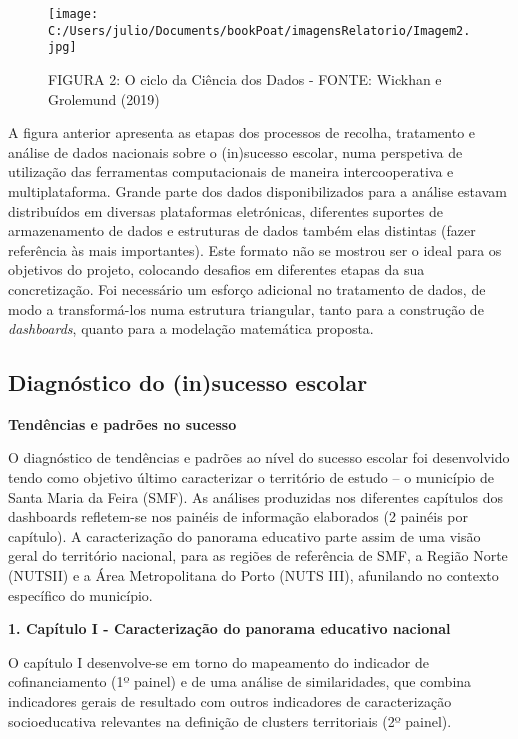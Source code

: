 \documentclass[
]{book}
\begin{document}
\begin{figure}
\centering
\texttt{[image: C:/Users/julio/Documents/bookPoat/imagensRelatorio/Imagem2.jpg]}
\caption{FIGURA 2: O ciclo da Ciência dos Dados - FONTE: Wickhan e Grolemund (2019)}
\end{figure}

A figura anterior apresenta as etapas dos processos de recolha, tratamento e análise de dados nacionais sobre o (in)sucesso escolar, numa perspetiva de utilização das ferramentas computacionais de maneira intercooperativa e multiplataforma. Grande parte dos dados disponibilizados para a análise estavam distribuídos em diversas plataformas eletrónicas, diferentes suportes de armazenamento de dados e estruturas de dados também elas distintas (fazer referência às mais importantes). Este formato não se mostrou ser o ideal para os objetivos do projeto, colocando desafios em diferentes etapas da sua concretização. Foi necessário um esforço adicional no tratamento de dados, de modo a transformá-los numa estrutura triangular, tanto para a construção de \emph{dashboards}, quanto para a modelação matemática proposta.

\hypertarget{diagnuxf3stico-do-insucesso-escolar}{%
\subsection{\texorpdfstring{\textbf{Diagnóstico do (in)sucesso escolar}}{Diagnóstico do (in)sucesso escolar}}\label{diagnuxf3stico-do-insucesso-escolar}}

\textbf{Tendências e padrões no sucesso}

O diagnóstico de tendências e padrões ao nível do sucesso escolar foi desenvolvido tendo como objetivo último caracterizar o território de estudo -- o município de Santa Maria da Feira (SMF). As análises produzidas nos diferentes capítulos dos dashboards refletem-se nos painéis de informação elaborados (2 painéis por capítulo). A caracterização do panorama educativo parte assim de uma visão geral do território nacional, para as regiões de referência de SMF, a Região Norte (NUTSII) e a Área Metropolitana do Porto (NUTS III), afunilando no contexto específico do município.

\textbf{1. Capítulo I - Caracterização do panorama educativo nacional}

O capítulo I desenvolve-se em torno do mapeamento do indicador de cofinanciamento (1º painel) e de uma análise de similaridades, que combina indicadores gerais de resultado com outros indicadores de caracterização socioeducativa relevantes na definição de clusters territoriais (2º painel).
\end{document}
